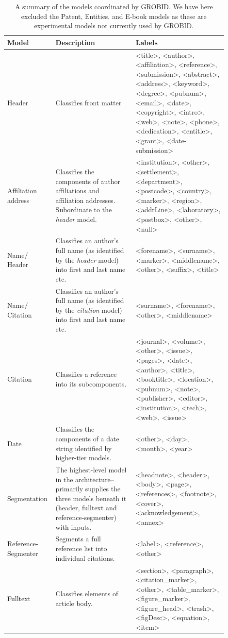 \begin{center}
\begin{table}
\begin{tabular}{ | p{0.15\linewidth} | p{0.35\linewidth} | p{0.4\linewidth} |}
    \hline
    Model & Description & Labels \\ \hline
    Header & Classifies front matter & <title>, <author>, <affiliation>, <reference>, <submission>, <abstract>, <address>, <keyword>, <degree>, <pubnum>, <email>, <date>, <copyright>, <intro>, <web>, <note>, <phone>, <dedication>, <entitle>, <grant>, <date-submission> \\ \hline
    Affiliation address & Classifies the components of author affiliations and affiliation addresses. Subordinate to the \emph{header} model. & <institution>, <other>, <settlement>, <department>, <postcode>, <country>, <marker>, <region>, <addrLine>, <laboratory>, <postbox>, <other>, <null> \\ \hline
    Name/ Header & Classifies an author's full name (as identified by the \emph{header} model) into first and last name etc.  & <forename>, <surname>, <marker>, <middlename>, <other>, <suffix>, <title> \\ \hline
    Name/ Citation &  Classifies an author's full name (as identified by the \emph{citation} model) into first and last name etc. & <surname>, <forename>, <other>, <middlename> \\ \hline
    Citation & Classifies a reference into its subcomponents. & <journal>, <volume>, <other>, <issue>, <pages>, <date>, <author>, <title>, <booktitle>, <location>, <pubnum>, <note>, <publisher>, <editor>, <institution>, <tech>, <web>, <issue> \\ \hline
    Date & Classifies the components of a date string identified by higher-tier models. & <other>, <day>, <month>, <year> \\ \hline
    Segmentation & The highest-level model in the architecture--primarily supplies the three models beneath it (header, fulltext and reference-segmenter) with inputs. & <headnote>, <header>, <body>, <page>, <references>, <footnote>, <cover>, <acknowledgement>, <annex> \\ \hline
    Reference-Segmenter & Segments a full reference list into individual citations. & <label>, <reference>, <other> \\ \hline
    Fulltext & Classifies elements of article body. & <section>, <paragraph>, <citation\_marker>, <other>, <table\_marker>, <figure\_marker>, <figure\_head>, <trash>, <figDesc>, <equation>, <item> \\ \hline
\end{tabular}
\caption{A summary of the models coordinated by GROBID. We have here excluded the Patent, Entities, and E-book models as these are experimental models not currently used by GROBID.}
\label{table:featurelist}
\end{table}
\end{center}

